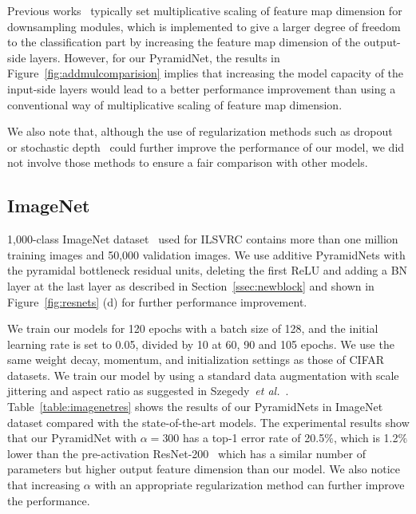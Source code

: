 \documentclass[10pt,twocolumn,letterpaper]{article}
\begin{document}
Previous works~\cite{resnet, VGG} typically set multiplicative scaling of feature map dimension for downsampling modules, which is implemented to give a larger degree of freedom to the classification part by increasing the feature map dimension of the output-side layers. However, for our PyramidNet, the results in Figure~\ref{fig:addmulcomparision} implies that increasing the model capacity of the input-side layers would lead to a better performance improvement than using a conventional way of multiplicative scaling of feature map dimension.

We also note that, although the use of regularization methods such as dropout~\cite{dropout} or stochastic depth~\cite{stochasticdepth} could further improve the performance of our model, we did not involve those methods to ensure a fair comparison with other models.

\subsection{ImageNet}
1,000-class ImageNet dataset~\cite{ImageNet} used for ILSVRC contains more than one million training images and 50,000 validation images. We use additive PyramidNets with the pyramidal bottleneck residual units, deleting the first ReLU and adding a BN layer at the last layer as described in Section~\ref{ssec:newblock} and shown in Figure~\ref{fig:resnets} (d) for further performance improvement.%

We train our models for 120 epochs with a batch size of 128, and the initial learning rate is set to 0.05, divided by 10 at 60, 90 and 105 epochs. We use the same weight decay, momentum, and initialization settings as those of CIFAR datasets. We train our model by using a standard data augmentation with scale jittering and aspect ratio as suggested in Szegedy~{\it et al.}~\cite{GoogleNet}. Table~\ref{table:imagenetres} shows the results of our PyramidNets in ImageNet dataset compared with the state-of-the-art models. %
The experimental results show that our PyramidNet with $\alpha=300$ has a top-1 error rate of 20.5$\%$, which is 1.2$\%$ lower than the pre-activation ResNet-200~\cite{preresnet} which has a similar number of parameters but higher output feature dimension than our model. We also notice that increasing $\alpha$ with an appropriate regularization method can further improve the performance.
\end{document}

